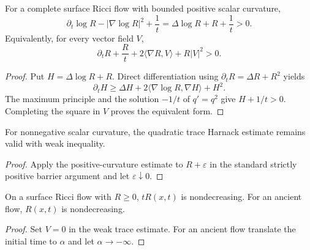 \begin{proposition}
\label{prop:chow-ii-surface-trace-harnack-positive-curvature}

For a complete surface Ricci flow with bounded positive scalar curvature,
\[
\partial_t\log R-|\nabla\log R|^2+\frac1t
=\Delta\log R+R+\frac1t>0.
\]
Equivalently, for every vector field \(V\),
\[
\partial_tR+\frac Rt+2\langle\nabla R,V\rangle+R|V|^2>0.
\]
\end{proposition}
\begin{proof}
\sketch Put \(H=\Delta\log R+R\).  Direct differentiation using
\(\partial_tR=\Delta R+R^2\) yields
\[
\partial_tH\ge\Delta H+2\langle\nabla\log R,\nabla H\rangle+H^2.
\]
The maximum principle and the solution \(-1/t\) of \(q'=q^2\) give
\(H+1/t>0\).  Completing the square in \(V\) proves the equivalent form.
\end{proof}

\begin{remark}
\label{rem:chow-ii-surface-trace-harnack-nonnegative-curvature}


For nonnegative scalar curvature, the quadratic trace Harnack estimate remains
valid with weak inequality.
\end{remark}
\begin{proof}
\sketch Apply the positive-curvature estimate to \(R+\varepsilon\) in the standard
strictly positive barrier argument and let \(\varepsilon\downarrow0\).
\end{proof}

\begin{corollary}
\label{cor:chow-ii-surface-tr-monotonicity}


On a surface Ricci flow with \(R\ge0\), \(tR(x,t)\) is nondecreasing.  For an
ancient flow, \(R(x,t)\) is nondecreasing.
\end{corollary}
\begin{proof}
\sketch Set \(V=0\) in the weak trace estimate.  For an ancient flow translate the
initial time to \(\alpha\) and let \(\alpha\to-\infty\).
\end{proof}

